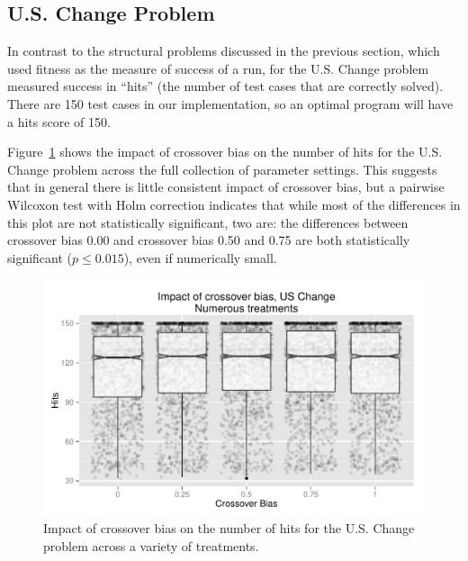 \documentclass{sig-alternate}
\begin{document}
%
%
%
%

\subsection{U.S. Change Problem}

In contrast to the structural problems discussed in the previous section, which used fitness as the measure of success
of a run, for the U.S. Change problem measured success in ``hits'' (the number of test cases that are correctly
solved). There are 150 test cases in our implementation, so an optimal program will have a hits score of 150.

Figure~\ref{fig:USChange_Hits} shows the impact of crossover bias on the number of hits for the U.S. Change problem
across the full collection of parameter settings. This suggests that in general there is little consistent impact of
crossover bias, but a pairwise Wilcoxon test with Holm correction indicates that while most of the differences in this
plot are not statistically significant, two are: the differences between crossover bias 0.00 and crossover bias 0.50 and
0.75 are both statistically significant ($p \leq 0.015$), even if numerically small.

\begin{figure}
\centering
\includegraphics[width=0.45 \textwidth]{Plots/US_change_hits.pdf}
\caption{Impact of crossover bias on the number of hits for the U.S. Change problem across a variety of treatments.}
\label{fig:USChange_Hits}
\end{figure}

%
%
%
%
\end{document}
